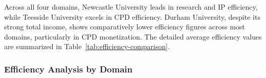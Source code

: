 \documentclass[journal,onecolumn, 10pt,draftclsnofoot]{IEEEtran}
\begin{document}
Across all four domains, Newcastle University leads in research and IP efficiency, while Teesside University excels in CPD efficiency. Durham University, despite its strong total income, shows comparatively lower efficiency figures across most domains, particularly in CPD monetization. The detailed average efficiency values are summarized in Table~\ref{tab:efficiency-comparison}.
\vspace{0.25cm}
\begin{table}[h]
\centering
\caption{North East University Efficiency Comparison}
\vspace{0.1cm}
\label{tab:efficiency-comparison}
\end{table}

\subsubsection{Efficiency Analysis by Domain}
\end{document}

